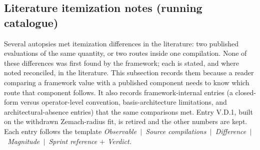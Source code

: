 \documentclass[11pt]{article}
\begin{document}
\subsection{Literature itemization notes (running catalogue)}
\label{sec:convention_exposures}

Several autopsies met itemization differences in the literature: two
published evaluations of the same quantity, or two routes inside one
compilation.  None of these differences was first found by the
framework; each is stated, and where noted reconciled, in the
literature.  This subsection records them because a reader comparing a
framework value with a published component needs to know which route
that component follows.  It also records framework-internal entries
(a closed-form versus operator-level convention, basis-architecture
limitations, and architectural-absence entries) that the same
comparisons met.  Entry
V.D.1, built on the withdrawn Zemach-radius fit, is retired and the
other numbers are kept.  Each entry follows the template
\emph{Observable~$|$~Source compilations~$|$~Difference~$|$~Magnitude~$|$~Sprint
reference $+$ Verdict.}
\end{document}
